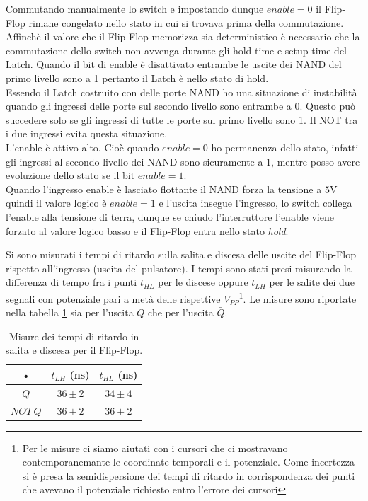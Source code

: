 \documentclass[10pt,a4paper]{article}
\begin{document}
Commutando manualmente lo switch e impostando dunque $enable = 0$ il Flip-Flop rimane congelato nello stato in cui si trovava prima della commutazione.
Affinchè il valore che il Flip-Flop memorizza sia deterministico è necessario che la commutazione dello switch non avvenga durante gli hold-time e setup-time del Latch. Quando il bit di enable è disattivato entrambe le uscite dei NAND del primo livello sono a 1 pertanto il Latch è nello stato di hold.\\

Essendo il Latch costruito con delle porte NAND ho una situazione di instabilità quando gli ingressi delle porte sul secondo livello sono entrambe a 0. Questo può succedere solo se gli ingressi di tutte le porte sul primo livello sono 1. Il NOT tra i due ingressi evita questa situazione.\\
L'enable è attivo alto. Cioè quando $enable = 0$ ho permanenza dello stato, infatti gli ingressi al secondo livello dei NAND sono sicuramente a 1, mentre posso avere evoluzione dello stato se il bit $enable = 1$.\\
Quando l'ingresso enable è lasciato flottante il NAND forza la tensione a $5$V quindi il valore logico è   $enable = 1$ e l'uscita insegue l'ingresso, lo switch collega l'enable alla tensione di terra, dunque se chiudo l'interruttore l'enable viene forzato al valore logico basso e il Flip-Flop entra nello stato \emph{hold}.%

Si sono misurati i tempi di ritardo sulla salita e discesa delle uscite del Flip-Flop rispetto all'ingresso (uscita del pulsatore). I tempi sono stati presi misurando la differenza di tempo fra i punti $t_{HL}$ per le discese oppure $t_{LH}$ per le salite dei due segnali con potenziale pari a metà delle rispettive $V_{PP}$\footnote{Per le misure ci siamo aiutati con i cursori che ci mostravano contemporanemante le coordinate temporali e il potenziale. Come incertezza si è presa la semidispersione dei tempi di ritardo in corrispondenza dei punti che avevano il potenziale richiesto entro l'errore dei cursori}. Le misure sono riportate nella tabella \ref{ritardo} sia per l'uscita $Q$ che per l'uscita $\bar{Q}$.

\begin{table}[!htb]
\centering
\begin{tabular}{|c|c|c|}
\hline 
• & $t_{LH}$ (ns) & $t_{HL}$ (ns)\\
\hline
$Q$ & $36 \pm 2$ & $34 \pm 4$\\
\hline
$NOT\,Q$ & $36 \pm 2$ & $36 \pm 2$\\
\hline
\end{tabular}
\caption{Misure dei tempi di ritardo in salita e discesa per il Flip-Flop.\label{ritardo}}
\end{table}
\end{document}
